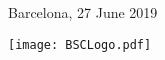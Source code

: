\begin{center}
\vspace{10mm}

{\large Barcelona, 27 June 2019}

\vspace{10mm}

\begin{center}
 \texttt{[image: BSCLogo.pdf]}
\end{center}


\end{center}
\restoregeometry
